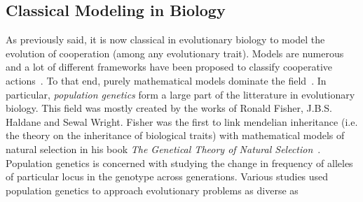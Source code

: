 

  \subsection{Classical Modeling in Biology}

    As previously said, it is now classical in evolutionary biology to model the evolution of cooperation (among any evolutionary trait). Models are numerous and a lot of different frameworks have been proposed to classify cooperative actions~\parencite{Dugatkin2002, Sachs2004, Lehmann2006}. To that end, purely mathematical models dominate the field~\parencite{Servedio2014}. In particular, \emph{population genetics} form a large part of the litterature in evolutionary biology. This field was mostly created by the works of Ronald Fisher, J.B.S. Haldane and Sewal Wright. Fisher was the first to link mendelian inheritance (i.e. the theory on the inheritance of biological traits) with mathematical models of natural selection in his book \textit{The Genetical Theory of Natural Selection}~\parencite{Fisher1930}. Population genetics is concerned with studying the change in frequency of alleles of particular locus in the genotype across generations. Various studies used population genetics to approach evolutionary problems as diverse as 
    


